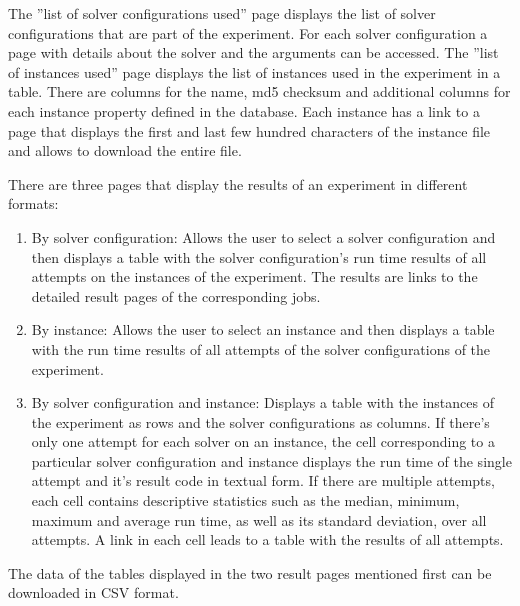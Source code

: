 The ''list of solver configurations used'' page displays the list of solver configurations that are part of the experiment. For each solver configuration
a page with details about the solver and the arguments can be accessed.
The ''list of instances used'' page displays the list of instances used in the experiment in a table. There are columns for the name, md5 checksum and additional columns for each
instance property defined in the database. Each instance has a link to a page that displays the first and last few hundred characters of the instance file and allows to download
the entire file.

There are three pages that display the results of an experiment in different formats:
\begin{enumerate}
\item By solver configuration: Allows the user to select a solver configuration and then displays a table with the solver configuration's run time results of all attempts on the instances
of the experiment. The results are links to the detailed result pages of the corresponding jobs.
\item By instance: Allows the user to select an instance and then displays a table with the run time results of all attempts of the solver configurations of the experiment.
\item By solver configuration and instance: Displays a table with the instances of the experiment as rows and the solver configurations as columns.
If there's only one attempt for each solver on an instance, the cell corresponding to a particular solver configuration and instance displays the
run time of the single attempt and it's result code in textual form. If there are multiple attempts, each cell contains descriptive statistics such as the
median, minimum, maximum and average run time, as well as its standard deviation, over all attempts. A link in each cell leads to a table with the results of all attempts.
\end{enumerate}
The data of the tables displayed in the two result pages mentioned first can be downloaded in CSV format.

